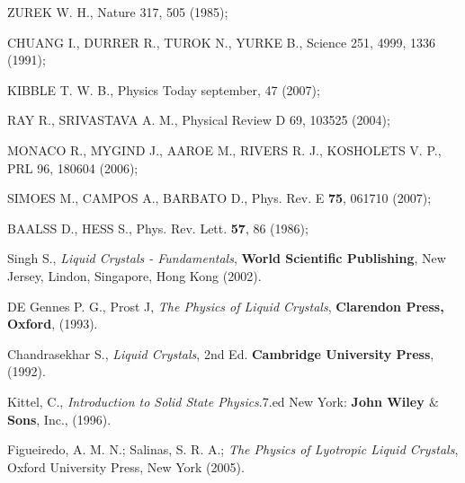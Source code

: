 ﻿\renewcommand{\bibname}{Referências}
\begin{thebibliography}{99}


 ZUREK W. H., Nature 317, 505 (1985); 

 CHUANG I., DURRER R., TUROK N., YURKE B., Science 251, 4999, 1336 (1991);
 

 KIBBLE T. W. B., Physics Today september, 47 (2007);
 

 RAY R., SRIVASTAVA A. M., Physical Review D 69, 103525 (2004); 

 MONACO R., MYGIND J., AAROE M., RIVERS R. J., KOSHOLETS V. P., PRL 96, 
180604 (2006); 

 SIMOES M., CAMPOS A., BARBATO D.,  Phys. Rev. E \textbf{75}, 061710 (2007);

 BAALSS D., HESS S., Phys. Rev. Lett. \textbf{57}, 86 (1986);



 Singh S., \textit{Liquid Crystals - Fundamentals}, \textbf{World Scientific Publishing}, New Jersey, Lindon, Singapore, Hong Kong (2002).

 DE Gennes P. G., Prost J, \textit{The Physics of Liquid Crystals}, \textbf{Clarendon Press, Oxford}, (1993).

 Chandrasekhar S., \textit{Liquid Crystals}, 2nd Ed. \textbf{Cambridge University Press},  (1992).

 Kittel, C., \textit{Introduction to Solid State Physics}.7.ed New York: \textbf{John Wiley $\&$ Sons}, Inc., (1996).

 Figueiredo, A. M. N.; Salinas, S. R. A.; \textit{The Physics of Lyotropic Liquid Crystals}, Oxford University Press, New York (2005).


\end{thebibliography}
